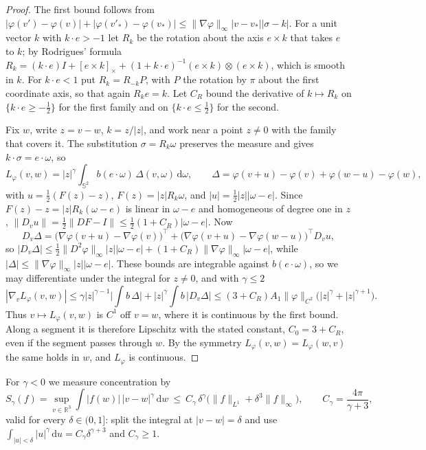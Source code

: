 \documentclass[11pt]{amsart}
\theoremstyle{definition}
\newcommand{\RR}{\mathbb{R}}
\newcommand{\Sph}{\mathbb{S}}
\newcommand{\dd}{\,\mathrm{d}}
\begin{document}
\begin{proof}
The first bound follows from $|\varphi(v')-\varphi(v)|+|\varphi(v'_*)-\varphi(v_*)|\le\|\nabla\varphi\|_\infty|v-v_*||\sigma-k|$. For a unit vector $k$ with $k\cdot e>-1$ let $R_k$ be the rotation about the axis $e\times k$ that takes $e$ to $k$; by Rodrigues' formula $R_k=(k\cdot e)I+[e\times k]_\times+(1+k\cdot e)^{-1}(e\times k)\otimes(e\times k)$, which is smooth in $k$. For $k\cdot e<1$ put $R_k=R_{-k}P$, with $P$ the rotation by $\pi$ about the first coordinate axis, so that again $R_ke=k$. Let $C_R$ bound the derivative of $k\mapsto R_k$ on $\{k\cdot e\ge-\frac12\}$ for the first family and on $\{k\cdot e\le\frac12\}$ for the second.

Fix $w$, write $z=v-w$, $k=z/|z|$, and work near a point $z\ne0$ with the family that covers it. The substitution $\sigma=R_k\omega$ preserves the measure and gives $k\cdot\sigma=e\cdot\omega$, so
\[
L_\varphi(v,w)=|z|^\gamma\int_{\Sph^2}b(e\cdot\omega)\,\Delta(v,\omega)\dd\omega,\qquad \Delta=\varphi(v+u)-\varphi(v)+\varphi(w-u)-\varphi(w),
\]
with $u=\frac12(F(z)-z)$, $F(z)=|z|R_k\omega$, and $|u|=\frac12|z||\omega-e|$. Since $F(z)-z=|z|R_k(\omega-e)$ is linear in $\omega-e$ and homogeneous of degree one in $z$, $\|D_vu\|=\frac12\|DF-I\|\le\frac12(1+C_R)|\omega-e|$. Now
\[
D_v\Delta=\big(\nabla\varphi(v+u)-\nabla\varphi(v)\big)^{\!\top}+\big(\nabla\varphi(v+u)-\nabla\varphi(w-u)\big)^{\!\top}D_vu,
\]
so $|D_v\Delta|\le\frac12\|D^2\varphi\|_\infty|z||\omega-e|+(1+C_R)\|\nabla\varphi\|_\infty|\omega-e|$, while $|\Delta|\le\|\nabla\varphi\|_\infty|z||\omega-e|$. These bounds are integrable against $b(e\cdot\omega)$, so we may differentiate under the integral for $z\ne0$, and with $\gamma\le2$
\[
|\nabla_vL_\varphi(v,w)|\le\gamma|z|^{\gamma-1}\Big|\int b\,\Delta\Big|+|z|^\gamma\int b\,|D_v\Delta|\le(3+C_R)A_1\|\varphi\|_{C^2}\big(|z|^\gamma+|z|^{\gamma+1}\big).
\]
Thus $v\mapsto L_\varphi(v,w)$ is $C^1$ off $v=w$, where it is continuous by the first bound. Along a segment it is therefore Lipschitz with the stated constant, $C_0=3+C_R$, even if the segment passes through $w$. By the symmetry $L_\varphi(v,w)=L_\varphi(w,v)$ the same holds in $w$, and $L_\varphi$ is continuous.
\end{proof}

For $\gamma<0$ we measure concentration by
\begin{equation}\label{eq:S}
S_\gamma(f)=\sup_{v\in\RR^3}\int|f(w)|\,|v-w|^\gamma\dd w\ \le\ C_\gamma\,\delta^\gamma\big(\|f\|_{L^1}+\delta^3\|f\|_\infty\big),\qquad C_\gamma=\frac{4\pi}{\gamma+3},
\end{equation}
valid for every $\delta\in(0,1]$: split the integral at $|v-w|=\delta$ and use $\int_{|u|<\delta}|u|^\gamma\dd u=C_\gamma\delta^{\gamma+3}$ and $C_\gamma\ge1$.
\end{document}
